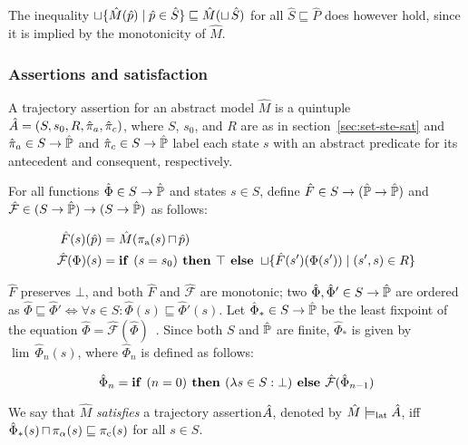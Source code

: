 \noindent The inequality $\operatorname{\sqcup} \{ \hat M(\hat p) \mid \hat p \in \hat S \} \sqsubseteq \hat M(\operatorname{\sqcup} \hat S)$ for all $\hat S \sqsubseteq \hat P$ does however hold, since it is implied by the monotonicity of $\hat M$.

\subsubsection{Assertions and satisfaction} \label{sec:lat-ste-sat}

A trajectory assertion for an abstract model $\hat M$ is a quintuple $\hat {A} = (S, s_{0}, R, \hat{\pi}_{a}, \hat{\pi}_{c})$, where $S$, $s_{0}$, and $R$ are as in section~\ref{sec:set-ste-sat} and $\hat{\pi}_{a} \in S \rightarrow \hat{\mathbb{P}}$ and $\hat{\pi}_{c} \in S \rightarrow \hat{\mathbb{P}}$ label each state $s$ with an abstract predicate for its antecedent and consequent, respectively.

 For all functions $\hat \Phi \in S \rightarrow \hat{\mathbb{P}}$ and states $s \in S$, define $\hat F \in S \rightarrow (\hat{\mathbb{P}} \rightarrow \hat{\mathbb{P}})$ and $\hat{\mathcal{F}} \in (S \rightarrow \hat{\mathbb{P}}) \rightarrow (S \rightarrow \hat{\mathbb{P}})$ as follows:

\begin{align}
\hat F(s)(\hat p) &= \hat M(\operatorname{\pi_{\textrm{a}}}(s) \operatorname{\sqcap} \hat p) \\
\hat{\mathcal{F}}(\Phi)(s) &= \textrm{\textbf{if }} (s = s_{0}) \textrm{\textbf{ then }} \top \textrm{\textbf{ else }} \operatorname{\sqcup} \{ \hat F(s')(\Phi(s')) \mid (s',s) \in R \}
\end{align}

\noindent $\hat F$ preserves $\bot$, and both $\hat F$ and $\hat{\mathcal{F}}$ are monotonic; two $\hat \Phi, \hat \Phi' \in S \rightarrow \hat{\mathbb{P}}$ are ordered as $\hat \Phi \sqsubseteq \hat \Phi' \iff \forall s \in S : \hat \Phi(s) \sqsubseteq \hat \Phi'(s)$. Let $\hat \Phi_{*} \in S \rightarrow \hat{\mathbb{P}}$ be the least fixpoint of the equation $\hat \Phi = \hat{\mathcal{F}}(\hat \Phi)$~\cite{davey2002}. Since both $S$ and $\hat{\mathbb{P}}$ are finite, $\hat \Phi_{*}$ is given by $\lim \, \hat \Phi_{n}(s)$, where $\hat \Phi_{n}$ is defined as follows:

\begin{equation}
\hat \Phi_{n} = \textrm{\textbf{if }} (n = 0) \textrm{\textbf{ then }} (\lambda s \in S : \bot) \textrm{\textbf{ else }} \hat{\mathcal{F}}(\hat \Phi_{n-1})
\end{equation}

We say that $\hat M$ \textit{satisfies} a trajectory assertion\footnotemark $\hat {A}$, denoted by $\hat M \models_{\textrm{lat}} \hat {A}$, iff $\hat \Phi_{*}(s) \operatorname{\sqcap} \pi_{\alpha}(s) \sqsubseteq \operatorname{\pi_{\textrm{c}}}(s)$ for all $s \in S$.

